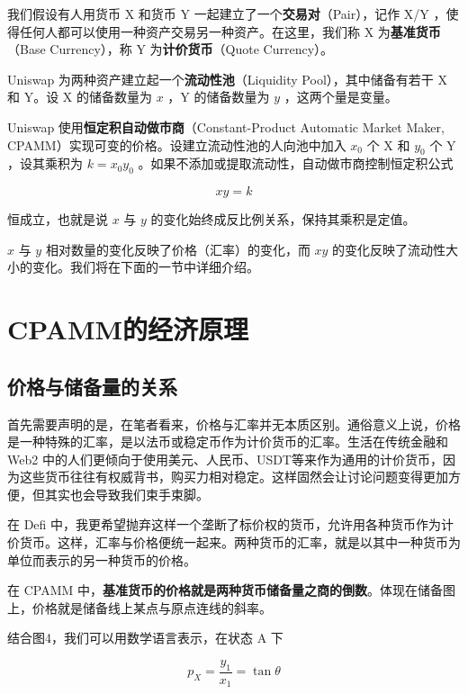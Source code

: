 \documentclass[12pt, a4paper, oneside]{ctexart}
\begin{document}
我们假设有人用货币 X 和货币 Y 一起建立了一个\textbf{交易对}（Pair），记作 X/Y ，使得任何人都可以使用一种资产交易另一种资产。在这里，我们称 X 为\textbf{基准货币}（Base Currency），称 Y 为\textbf{计价货币}（Quote Currency）。

Uniswap 为两种资产建立起一个\textbf{流动性池}（Liquidity Pool），其中储备有若干 X 和 Y。设 X 的储备数量为 $x$ ，Y 的储备数量为 $y$ ，这两个量是变量。

Uniswap 使用\textbf{恒定积自动做市商}（Constant-Product Automatic Market Maker, CPAMM）实现可变的价格。设建立流动性池的人向池中加入 $x_0$ 个 X 和 $y_0$ 个 Y ，设其乘积为 $k=x_0y_0$ 。如果不添加或提取流动性，自动做市商控制恒定积公式

\begin{equation}
    xy=k 
\end{equation}

恒成立，也就是说 $x$ 与 $y$ 的变化始终成反比例关系，保持其乘积是定值。

$x$ 与 $y$ 相对数量的变化反映了价格（汇率）的变化，而 $xy$ 的变化反映了流动性大小的变化。我们将在下面的一节中详细介绍。

\section{CPAMM的经济原理}

\subsection{价格与储备量的关系}

首先需要声明的是，在笔者看来，价格与汇率并无本质区别。通俗意义上说，价格是一种特殊的汇率，是以法币或稳定币作为计价货币的汇率。生活在传统金融和 Web2 中的人们更倾向于使用美元、人民币、USDT等来作为通用的计价货币，因为这些货币往往有权威背书，购买力相对稳定。这样固然会让讨论问题变得更加方便，但其实也会导致我们束手束脚。

在 Defi 中，我更希望抛弃这样一个垄断了标价权的货币，允许用各种货币作为计价货币。这样，汇率与价格便统一起来。两种货币的汇率，就是以其中一种货币为单位而表示的另一种货币的价格。

在 CPAMM 中，\textbf{基准货币的价格就是两种货币储备量之商的倒数}。体现在储备图上，价格就是储备线上某点与原点连线的斜率。

结合图4，我们可以用数学语言表示，在状态 A 下

$$
p_X = \frac{y_1}{x_1} = \tan \theta
$$
\end{document}

